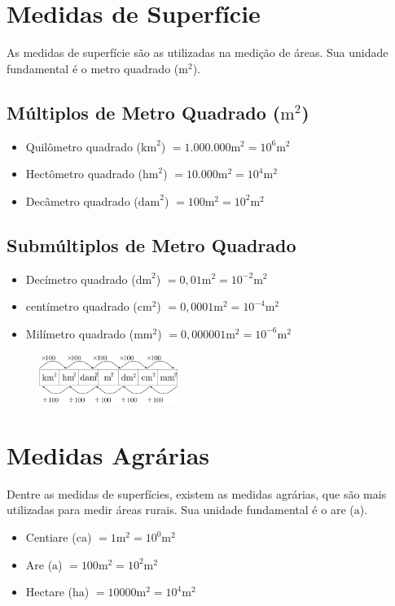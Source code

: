 \section{Medidas de Superfície}
As medidas de superfície são as utilizadas na medição de
áreas. Sua unidade fundamental é o metro quadrado ($\mathrm{m}^2$).
    \subsection{Múltiplos de Metro Quadrado ($\mathrm{m}^2$)}
		\begin{itemize}
			\item Quilômetro quadrado ($\mathrm{km}^2$) $= 1.000.000 \mathrm{m}^2 = 10^6 \mathrm{m}^2$
			\item Hectômetro quadrado ($\mathrm{hm}^2$) $= 10.000 \mathrm{m}^2 = 10^4 \mathrm{m}^2$
			\item Decâmetro quadrado ($\mathrm{dam}^2$) $= 100 \mathrm{m}^2 = 10^2 \mathrm{m}^2$
		\end{itemize}
		
\newpage
	\subsection{Submúltiplos de Metro Quadrado}
		\begin{itemize}
			\item Decímetro quadrado ($\mathrm{dm}^2$) $= 0,01\mathrm{m}^2 = 10^{-2}\mathrm{m}^2$
			\item centímetro quadrado ($\mathrm{cm}^2$) $= 0,0001\mathrm{m}^2 = 10^{-4}\mathrm{m}^2$
			\item Milímetro quadrado ($\mathrm{mm}^2$) $= 0,000001\mathrm{m}^2 = 10^{-6}\mathrm{m}^2$
		\end{itemize}

    \begin{figure}[!h]
		    \centering 
            \includegraphics[width=0.4\textwidth]{imagens/matematicaBasica/sistemaDeUnidades/MultiplosDeMetroQuadrado.pdf}
		\end{figure}
		
\section{Medidas Agrárias}
Dentre as medidas de superfícies, existem as medidas
agrárias, que são mais utilizadas para medir áreas rurais. Sua
unidade fundamental é o are ($\mathrm{a}$).
	\begin{itemize}
		\item Centiare ($\mathrm{ca}$) $= 1\mathrm{m}^{2}=10^{0}\mathrm{m}^{2}$
		\item Are ($\mathrm{a}$) $= 100\mathrm{m}^{2} = 10^{2}\mathrm{m}^{2}$
		\item Hectare ($\mathrm{ha}$) $= 10000\mathrm{m}^{2} = 10^{4}\mathrm{m}^{2}$
	\end{itemize}

